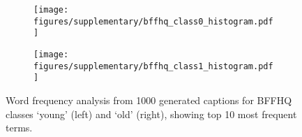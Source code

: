 \begin{figure}[htbp]
    \centering
    \begin{subfigure}[b]{0.45\columnwidth}
        \centering
        \texttt{[image: figures/supplementary/bffhq\_class0\_histogram.pdf]}
    \end{subfigure}
    \hfill
    \begin{subfigure}[b]{0.45\columnwidth}
        \centering
        \texttt{[image: figures/supplementary/bffhq\_class1\_histogram.pdf]}
    \end{subfigure}
    \caption{Word frequency analysis from 1000 generated captions for BFFHQ classes `young' (left) and `old' (right), showing top 10 most frequent terms.}
    \label{fig:bffhq_histograms}
\end{figure}



